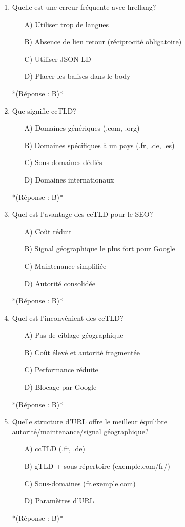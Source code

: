 \documentclass[12pt,a4paper,twoside]{report}
\begin{document}
\begin{enumerate}
\item Quelle est une erreur fréquente avec hreflang?
\begin{itemize}
\item[A)] Utiliser trop de langues
\item[B)] Absence de lien retour (réciprocité obligatoire)
\item[C)] Utiliser JSON-LD
\item[D)] Placer les balises dans le body
\end{itemize}
*(Réponse : B)*

\item Que signifie ccTLD?
\begin{itemize}
\item[A)] Domaines génériques (.com, .org)
\item[B)] Domaines spécifiques à un pays (.fr, .de, .es)
\item[C)] Sous-domaines dédiés
\item[D)] Domaines internationaux
\end{itemize}
*(Réponse : B)*

\item Quel est l'avantage des ccTLD pour le SEO?
\begin{itemize}
\item[A)] Coût réduit
\item[B)] Signal géographique le plus fort pour Google
\item[C)] Maintenance simplifiée
\item[D)] Autorité consolidée
\end{itemize}
*(Réponse : B)*

\item Quel est l'inconvénient des ccTLD?
\begin{itemize}
\item[A)] Pas de ciblage géographique
\item[B)] Coût élevé et autorité fragmentée
\item[C)] Performance réduite
\item[D)] Blocage par Google
\end{itemize}
*(Réponse : B)*

\item Quelle structure d'URL offre le meilleur équilibre autorité/maintenance/signal géographique?
\begin{itemize}
\item[A)] ccTLD (.fr, .de)
\item[B)] gTLD + sous-répertoire (exemple.com/fr/)
\item[C)] Sous-domaines (fr.exemple.com)
\item[D)] Paramètres d'URL
\end{itemize}
*(Réponse : B)*


\end{enumerate}
\end{document}
